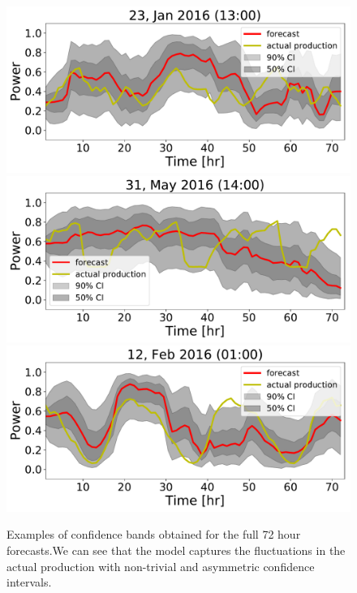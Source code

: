 \documentclass[ima, 20pt, portrait, plainboxedsections]{sciposter}
\begin{document}
\begin{multicols}{3}
\begin{figure}[t]
\begin{center}
   \includegraphics[width=0.8\linewidth]{72hr_forecast_CI_31.pdf} %
   \includegraphics[width=0.8\linewidth]{72hr_forecast_CI_437.pdf}
   \includegraphics[width=0.8\linewidth]{72hr_forecast_CI_82.pdf}

\end{center}
   \caption{ Examples of confidence bands obtained for the full 72 hour forecasts.We can see that the model captures the fluctuations in the actual production with non-trivial and asymmetric confidence intervals.}
\label{fig:72hr}
\end{figure}


\end{multicols}
\end{document}
